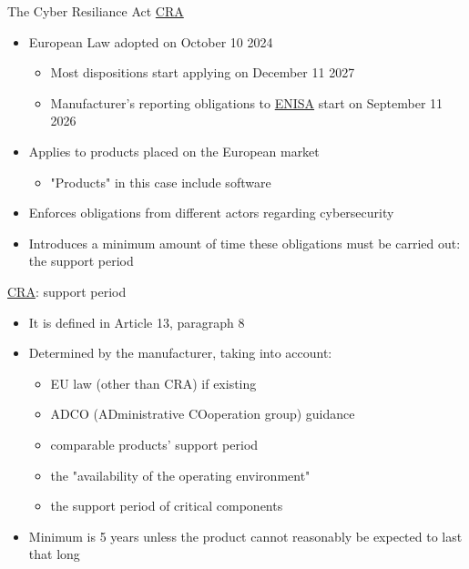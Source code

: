 \begin{frame}{The Cyber Resiliance Act \href{https://eur-lex.europa.eu/legal-content/EN/TXT/?uri=CELEX\%3A02024R2847-20241120}{CRA}}
  \begin{itemize}
    \item European Law adopted on October 10 2024
    \begin{itemize}
      \item Most dispositions start applying on December 11 2027
      \item Manufacturer's reporting obligations to \href{https://www.enisa.europa.eu/}{ENISA} start on September 11 2026
    \end{itemize}
    \item Applies to products placed on the European market
    \begin{itemize}
      \item "Products" in this case include software
    \end{itemize}
    \item Enforces obligations from different actors regarding cybersecurity
    \item Introduces a minimum amount of time these obligations must be carried out: the support period
  \end{itemize}
\end{frame}

\begin{frame}{\href{https://eur-lex.europa.eu/legal-content/EN/TXT/?uri=CELEX\%3A02024R2847-20241120}{CRA}: support period}
  \begin{itemize}
    \item It is defined in Article 13, paragraph 8
    \item Determined by the manufacturer, taking into account:
    \begin{itemize}
      \item EU law (other than CRA) if existing
      \item ADCO (ADministrative COoperation group) guidance
      \item comparable products' support period
      \item the "availability of the operating environment"
      \item the support period of critical components
    \end{itemize}
    \item Minimum is 5 years unless the product cannot reasonably be expected to last that long
  \end{itemize}
\end{frame}

